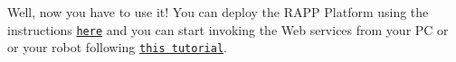 Well, now you have to use it! You can deploy the R\-A\-P\-P Platform using the instructions \href{https://github.com/rapp-project/rapp-platform/wiki/How-do-I-launch-the-RAPP-Platform%3F}{\tt here} and you can start invoking the Web services from your P\-C or or your robot following \href{https://github.com/rapp-project/rapp-platform/wiki/How-to-call-the-HOP-service-I-created%3F}{\tt this tutorial}. 